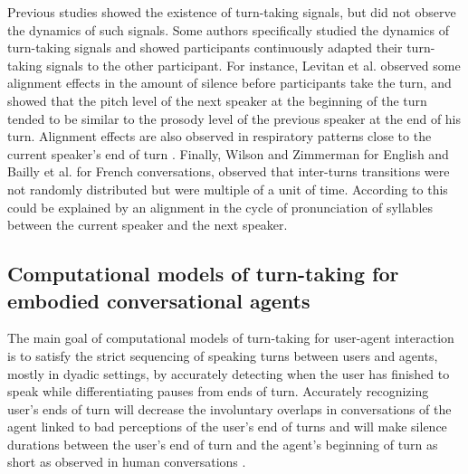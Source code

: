 Previous studies showed the existence of turn-taking signals, but did not observe the dynamics of such signals.
Some authors specifically studied the dynamics of turn-taking signals and showed participants continuously adapted their turn-taking signals to the other participant.
For instance,  Levitan et al. \citep{levitan_entrainment_2015} observed some
alignment effects in the amount of silence before participants
take the turn, and showed that the pitch level of
the next speaker at the beginning of the turn tended to
be similar to the prosody level of the previous speaker
at the end of his turn. 
Alignment effects are also observed in respiratory patterns close to the current speaker's end of turn \citep{mcfarland_respiratory_2001}.
Finally, Wilson and Zimmerman\citep{wilson_structure_1986} for English and Bailly et al. \citep{bailly_pauses_2012} for French conversations, observed that inter-turns transitions were not randomly distributed but were multiple of a unit of time. According to \citep{wilson_oscillator_2005} this could be explained by an alignment in the cycle of pronunciation of syllables between
the current speaker and the next speaker.


\subsection{Computational models of turn-taking for embodied conversational agents}
\label{comp_modelling}

The main goal of computational models of turn-taking for user-agent interaction is to satisfy the strict sequencing of speaking turns between users and agents, mostly in
dyadic settings, by accurately detecting when the user has finished to speak while differentiating pauses from ends of turn. Accurately recognizing user's ends of turn
will decrease the involuntary overlaps in conversations of the agent linked to bad perceptions of the user's end of turns and will make silence durations between the user's end of turn and the agent's beginning of turn as short as observed
in human conversations \citep{balentine_debouncing_1997,ward_root_2005,raux_optimizing_2012,
jonsdottir_distributed_2013}.

